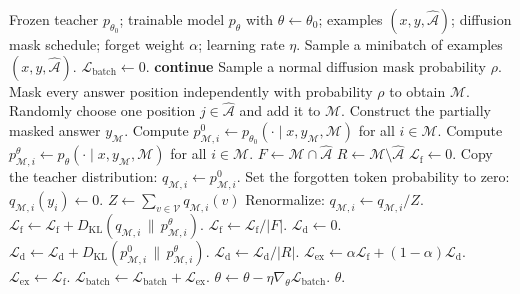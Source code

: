 \documentclass{article}
\newcommand{\V}{\mathcal{V}}
\newcommand{\Ahat}{\widehat{\mathcal A}}
\newcommand{\Mset}{\mathcal M}
\newcommand{\KL}{D_{\mathrm{KL}}}
\begin{document}
\begin{algorithm}[h]
\caption{Simple trajectory-selective distillation}
\label{alg:training}
\begin{algorithmic}[1]
\Require Frozen teacher $p_{\theta_0}$; trainable model $p_\theta$ with $\theta\gets\theta_0$; examples $(x,y,\Ahat)$; diffusion mask schedule; forget weight $\alpha$; learning rate $\eta$.
    \State Sample a minibatch of examples $(x,y,\Ahat)$.
    \State $\mathcal L_{\mathrm{batch}}\gets 0$.
    \ForAll{$(x,y,\Ahat)$ in the minibatch}
        \If{$\Ahat=\varnothing$}
            \State \textbf{continue} 
        \EndIf
        \State Sample a normal diffusion mask probability $\rho$.
        \State Mask every answer position independently with probability $\rho$ to obtain $\Mset$.
        \If{$\Mset\cap\Ahat=\varnothing$}
            \State Randomly choose one position $j\in\Ahat$ and add it to $\Mset$.
        \EndIf
        \State Construct the partially masked answer $y_{\Mset}$.
        \State Compute $p^0_{\Mset,i}\gets p_{\theta_0}(\cdot\mid x,y_{\Mset},\Mset)$ for all $i\in\Mset$.
        \State Compute $p^{\theta}_{\Mset,i}\gets p_{\theta}(\cdot\mid x,y_{\Mset},\Mset)$ for all $i\in\Mset$.
        \State $F\gets\Mset\cap\Ahat$ 
        \State $R\gets\Mset\setminus\Ahat$ 
        \State $\mathcal L_{\mathrm f}\gets 0$.
            \State Copy the teacher distribution: $q_{\Mset,i}\gets p^0_{\Mset,i}$.
            \State Set the forgotten token probability to zero: $q_{\Mset,i}(y_i)\gets 0$.
            \State $Z\gets\sum_{v\in\V}q_{\Mset,i}(v)$ 
            \State Renormalize: $q_{\Mset,i}\gets q_{\Mset,i}/Z$.
            \State $\mathcal L_{\mathrm f}\gets\mathcal L_{\mathrm f}+
            \KL\!\left(q_{\Mset,i}\,\|\,p^{\theta}_{\Mset,i}\right)$.
        \EndFor
        \State $\mathcal L_{\mathrm f}\gets\mathcal L_{\mathrm f}/|F|$.
        \State $\mathcal L_{\mathrm d}\gets 0$.
            \State $\mathcal L_{\mathrm d}\gets\mathcal L_{\mathrm d}+
            \KL\!\left(p^0_{\Mset,i}\,\|\,p^{\theta}_{\Mset,i}\right)$.
        \EndFor
            \State $\mathcal L_{\mathrm d}\gets\mathcal L_{\mathrm d}/|R|$.
            \State $\mathcal L_{\mathrm{ex}}\gets
            \alpha\mathcal L_{\mathrm f}+(1-\alpha)\mathcal L_{\mathrm d}$.
        \Else
            \State $\mathcal L_{\mathrm{ex}}\gets\mathcal L_{\mathrm f}$.
        \EndIf
        \State $\mathcal L_{\mathrm{batch}}\gets\mathcal L_{\mathrm{batch}}+\mathcal L_{\mathrm{ex}}$.
    \EndFor
    \State $\theta\gets\theta-\eta\nabla_\theta\mathcal L_{\mathrm{batch}}$.
\EndFor
\State \Return $\theta$.
\end{algorithmic}
\end{algorithm}
\end{document}
